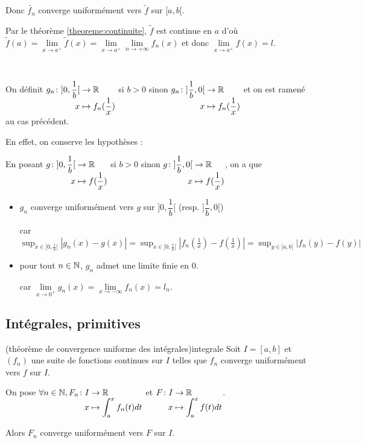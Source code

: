 \documentclass[a4paper, 12pt]{article}
\begin{document}
\begin{demonstration}
\begin{description}
        Donc $\tilde{f_n}$ converge uniformément vers $\tilde{f}$ sur $[a, b[$.
        
        Par le théorème \ref{theoreme:continuite}, $\tilde{f}$ est continue en $a$
        d'où $\tilde{f}(a) = \lim\limits_{x \to a^+} \tilde{f}(x) = \lim\limits_{x \to a^+} \lim\limits_{n \to +\infty} f_n(x)$ et donc $\lim\limits_{x \to a^+} f(x) = l$.

        \item[Le cas de $a = -\infty$]~\par
        On définit $\funcdef{g_n}{] 0, \dfrac{1}{b}[}{\R}{x}{f_n(\dfrac{1}{x})}$ si $b > 0$
        sinon $\funcdef{g_n}{]\dfrac{1}{b}, 0[}{\R}{x}{f_n(\dfrac{1}{x})}$ et on est ramené au cas précédent.

        En effet, on conserve les hypothèses :
        
        En posant $\funcdef{g}{] 0, \dfrac{1}{b}[}{\R}{x}{f(\dfrac{1}{x})}$ si $b > 0$
        sinon $\funcdef{g}{]\dfrac{1}{b}, 0[}{\R}{x}{f(\dfrac{1}{x})}$, on a que
        \begin{itemize}[label=--]
            \item $g_n$ converge uniformément vers $g$ sur $]0, \dfrac{1}{b}[$ (resp. $]\dfrac{1}{b}, 0[$)
            
            car $\sup_{x \in ]0, \frac{1}{b}[} |g_n(x) - g(x)| = \sup_{x \in ]0, \frac{1}{b}[} |f_n(\frac{1}{x}) - f(\frac{1}{x})| = \sup_{y \in ]a, b[} |f_n(y) - f(y)|$
            \item pour tout $n \in \mathbb{N}$, $g_n$ admet une limite finie en $0$.
            
            car $\lim\limits_{x \to 0^+} g_n(x) = \lim\limits_{x \to -\infty} f_n(x) = l_n$.
        \end{itemize}
    \end{description}
\end{demonstration}

\subsection{Intégrales, primitives}

\begin{theoreme}{(théorème de convergence uniforme des intégrales)}{integrale}
    Soit $I = [a, b]$ et $(f_n)$ une suite de fonctions continues sur $I$ telles que $f_n$ converge uniformément vers $f$ sur $I$.

    On pose $\forall n \in \N, \funcdef{F_n}{I}{\R}{x}{\int_a^x f_n(t) dt}$ et $\funcdef{F}{I}{\R}{x}{\int_a^x f(t) dt}$.

    Alors $F_n$ converge uniformément vers $F$ sur $I$.
\end{theoreme}
\end{document}
